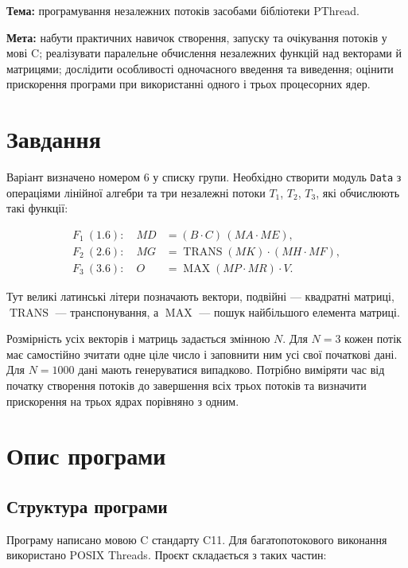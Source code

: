 \documentclass[12pt,a4paper]{article}
\begin{document}
\noindent
\textbf{Тема:} програмування незалежних потоків засобами бібліотеки
PThread.

\medskip

\noindent
\textbf{Мета:} набути практичних навичок створення, запуску та очікування
потоків у мові C; реалізувати паралельне обчислення незалежних функцій над
векторами й матрицями; дослідити особливості одночасного введення та
виведення; оцінити прискорення програми при використанні одного і трьох
процесорних ядер.

\section{Завдання}

Варіант визначено номером 6 у списку групи. Необхідно створити модуль
\texttt{Data} з операціями лінійної алгебри та три незалежні потоки
\(T_1\), \(T_2\), \(T_3\), які обчислюють такі функції:

\begin{align}
  F_1\ (1.6):\quad MD &= (B\cdot C)\,(MA\cdot ME),
  \label{eq:f1}\\
  F_2\ (2.6):\quad MG &= \operatorname{TRANS}(MK) \cdot (MH\cdot MF),
  \label{eq:f2}\\
  F_3\ (3.6):\quad O &= \operatorname{MAX}(MP\cdot MR) \cdot V.
  \label{eq:f3}
\end{align}

Тут великі латинські літери позначають вектори, подвійні --- квадратні
матриці, \(\operatorname{TRANS}\) --- транспонування, а
\(\operatorname{MAX}\) --- пошук найбільшого елемента матриці.

Розмірність усіх векторів і матриць задається змінною \(N\). Для
\(N=3\) кожен потік має самостійно зчитати одне ціле число і заповнити ним
усі свої початкові дані. Для \(N=1000\) дані мають генеруватися випадково.
Потрібно виміряти час від початку створення потоків до завершення всіх
трьох потоків та визначити прискорення на трьох ядрах порівняно з одним.

\section{Опис програми}

\subsection{Структура програми}

Програму написано мовою C стандарту C11. Для багатопотокового виконання
використано POSIX Threads. Проєкт складається з таких частин:
\end{document}
